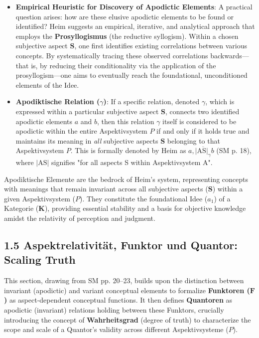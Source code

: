 \documentclass[12pt]{article}
\newcommand{\kategorie}{\bm{K}}
\newcommand{\conceptualsyndrome}{a}
\newcommand{\aspektivsystem}{P}
\newcommand{\funktor}{\bm{F}}
\begin{document}
\begin{itemize}
    \item \textbf{Empirical Heuristic for Discovery of Apodictic Elements}: A practical question arises: how are these elusive apodictic elements to be found or identified? Heim suggests an empirical, iterative, and analytical approach that employs the \textbf{Prosyllogismus} (the reductive syllogism). Within a chosen subjective aspect \( \mathbf{S} \), one first identifies existing correlations between various concepts. By systematically tracing these observed correlations backwards—that is, by reducing their conditionality via the application of the prosyllogism—one aims to eventually reach the foundational, unconditioned elements of the Idee. 
    \item \textbf{Apodiktische Relation (\( \gamma \))}: If a specific relation, denoted \( \gamma \), which is expressed within a particular subjective aspect \( \mathbf{S} \), connects two identified apodictic elements \( a \) and \( b \), then this relation \( \gamma \) itself is considered to be apodictic within the entire Aspektivsystem \( \aspektivsystem \) if and only if it holds true and maintains its meaning in \textit{all} subjective aspects \( \mathbf{S} \) belonging to that Aspektivsystem \( \aspektivsystem \). This is formally denoted by Heim as \( a, \overline{|\mathrm{AS}|_{\gamma}} b \) (SM p. 18), where \(|\mathrm{AS}|\) signifies "for all aspects S within Aspektivsystem A".
\end{itemize}

Apodiktische Elemente are the bedrock of Heim's system, representing concepts with meanings that remain invariant across all subjective aspects (\(\mathbf{S}\)) within a given Aspektivsystem (\(\aspektivsystem\)). They constitute the foundational Idee (\(\conceptualsyndrome_1\)) of a Kategorie (\(\kategorie\)), providing essential stability and a basis for objective knowledge amidst the relativity of perception and judgment.

\subsection{1.5 Aspektrelativität, Funktor und Quantor: Scaling Truth}
\label{sec:quantor}

This section, drawing from SM pp. 20--23, builds upon the distinction between invariant (apodictic) and variant conceptual elements to formalize \textbf{Funktoren (\(\funktor\))} as aspect-dependent conceptual functions. It then defines \textbf{Quantoren} as apodictic (invariant) relations holding between these Funktors, crucially introducing the concept of \textbf{Wahrheitsgrad} (degree of truth) to characterize the scope and scale of a Quantor's validity across different Aspektivsysteme (\(\aspektivsystem\)).
\end{document}
